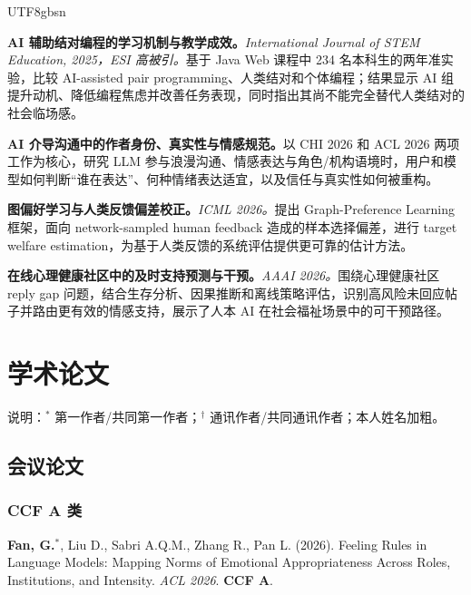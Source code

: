 \documentclass[a4paper,10pt]{article}
\newcommand{\cvlabel}[1]{\textbf{#1}}
\newcommand{\pubitem}[1]{\item #1}
\begin{document}
\begin{CJK*}{UTF8}{gbsn}
\begin{enumerate}[label=\textbf{[S\arabic*]}]
  \item \cvlabel{AI 辅助结对编程的学习机制与教学成效。}\textit{International Journal of STEM Education, 2025，ESI 高被引。}基于 Java Web 课程中 234 名本科生的两年准实验，比较 AI-assisted pair programming、人类结对和个体编程；结果显示 AI 组提升动机、降低编程焦虑并改善任务表现，同时指出其尚不能完全替代人类结对的社会临场感。

  \item \cvlabel{AI 介导沟通中的作者身份、真实性与情感规范。}以 CHI 2026 和 ACL 2026 两项工作为核心，研究 LLM 参与浪漫沟通、情感表达与角色/机构语境时，用户和模型如何判断“谁在表达”、何种情绪表达适宜，以及信任与真实性如何被重构。

  \item \cvlabel{图偏好学习与人类反馈偏差校正。}\textit{ICML 2026。}提出 Graph-Preference Learning 框架，面向 network-sampled human feedback 造成的样本选择偏差，进行 target welfare estimation，为基于人类反馈的系统评估提供更可靠的估计方法。

  \item \cvlabel{在线心理健康社区中的及时支持预测与干预。}\textit{AAAI 2026。}围绕心理健康社区 reply gap 问题，结合生存分析、因果推断和离线策略评估，识别高风险未回应帖子并路由更有效的情感支持，展示了人本 AI 在社会福祉场景中的可干预路径。
\end{enumerate}

\section*{学术论文}
{\small\color{cvgray} 说明：\(^*\) 第一作者/共同第一作者；\(^\dagger\) 通讯作者/共同通讯作者；本人姓名加粗。}

\subsection*{会议论文}
\subsubsection*{CCF A 类}
\begin{enumerate}[label=\textbf{[C\arabic*]}]
  \pubitem{\textbf{Fan, G.}$^{*}$, Liu D., Sabri A.Q.M., Zhang R., Pan L. (2026). Feeling Rules in Language Models: Mapping Norms of Emotional Appropriateness Across Roles, Institutions, and Intensity. \textit{ACL 2026}. \textbf{CCF A}. }


\end{enumerate}
\end{CJK*}
\end{document}
